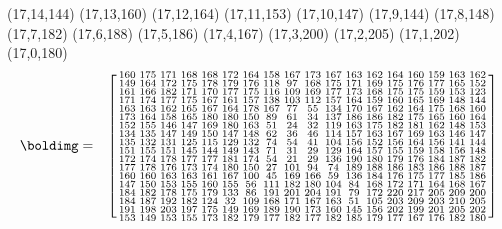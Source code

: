 (17,14,144) (17,13,160) (17,12,164) (17,11,153) (17,10,147) (17,9,144) (17,8,148) (17,7,182) (17,6,188) (17,5,186) (17,4,167) (17,3,200) (17,2,205) (17,1,202) (17,0,180)
%
%
\[
\begin{array}{cc}
\boldimg = & 
\left[
\begin{smallmatrix} 160 & 175 & 171 & 168 & 168 & 172 & 164 & 158 & 167 & 173 & 167 & 163 & 162 & 164 & 160 & 159 & 163 & 162\\ 149 & 164 & 172 & 175 & 178 & 179 & 176 & 118 & 97 & 168 & 175 & 171 & 169 & 175 & 176 & 177 & 165 & 152\\ 161 & 166 & 182 & 171 & 170 & 177 & 175 & 116 & 109 & 169 & 177 & 173 & 168 & 175 & 175 & 159 & 153 & 123\\ 171 & 174 & 177 & 175 & 167 & 161 & 157 & 138 & 103 & 112 & 157 & 164 & 159 & 160 & 165 & 169 & 148 & 144\\ 163 & 163 & 162 & 165 & 167 & 164 & 178 & 167 & 77 & 55 & 134 & 170 & 167 & 162 & 164 & 175 & 168 & 160\\ 173 & 164 & 158 & 165 & 180 & 180 & 150 & 89 & 61 & 34 & 137 & 186 & 186 & 182 & 175 & 165 & 160 & 164\\ 152 & 155 & 146 & 147 & 169 & 180 & 163 & 51 & 24 & 32 & 119 & 163 & 175 & 182 & 181 & 162 & 148 & 153\\ 134 & 135 & 147 & 149 & 150 & 147 & 148 & 62 & 36 & 46 & 114 & 157 & 163 & 167 & 169 & 163 & 146 & 147\\ 135 & 132 & 131 & 125 & 115 & 129 & 132 & 74 & 54 & 41 & 104 & 156 & 152 & 156 & 164 & 156 & 141 & 144\\ 151 & 155 & 151 & 145 & 144 & 149 & 143 & 71 & 31 & 29 & 129 & 164 & 157 & 155 & 159 & 158 & 156 & 148\\ 172 & 174 & 178 & 177 & 177 & 181 & 174 & 54 & 21 & 29 & 136 & 190 & 180 & 179 & 176 & 184 & 187 & 182\\ 177 & 178 & 176 & 173 & 174 & 180 & 150 & 27 & 101 & 94 & 74 & 189 & 188 & 186 & 183 & 186 & 188 & 187\\ 160 & 160 & 163 & 163 & 161 & 167 & 100 & 45 & 169 & 166 & 59 & 136 & 184 & 176 & 175 & 177 & 185 & 186\\ 147 & 150 & 153 & 155 & 160 & 155 & 56 & 111 & 182 & 180 & 104 & 84 & 168 & 172 & 171 & 164 & 168 & 167\\ 184 & 182 & 178 & 175 & 179 & 133 & 86 & 191 & 201 & 204 & 191 & 79 & 172 & 220 & 217 & 205 & 209 & 200\\ 184 & 187 & 192 & 182 & 124 & 32 & 109 & 168 & 171 & 167 & 163 & 51 & 105 & 203 & 209 & 203 & 210 & 205\\ 191 & 198 & 203 & 197 & 175 & 149 & 169 & 189 & 190 & 173 & 160 & 145 & 156 & 202 & 199 & 201 & 205 & 202\\ 153 & 149 & 153 & 155 & 173 & 182 & 179 & 177 & 182 & 177 & 182 & 185 & 179 & 177 & 167 & 176 & 182 & 180 \end{smallmatrix}\right]

\end{array}\]
